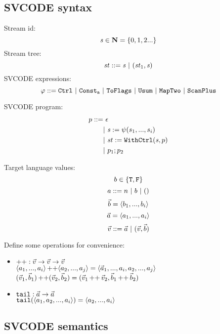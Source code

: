 \subsection{SVCODE syntax}
Stream id: $$\mathit{s} \in \mathbf{N} = \{0,1,2...\}$$
Stream tree: $$ \mathit{st} ::= \mathit{s} \ | \ (\mathit{st}_1,\mathit{s}) $$
SVCODE expressions: $$\varphi ::= \mathtt{Ctrl} \ | \ \mathtt{Const_{a}} \ | \ \mathtt{ToFlags}
\ | \ \mathtt{Usum} \ | \ \mathtt{MapTwo} \ | \ \mathtt{ScanPlus} $$

SVCODE program: 
\begin{align*}
	p ::= & \ \epsilon \\
	     &| \ \mathit{s} := \psi(s_1,...,s_i) \\
	     &| \ \mathit{st} := \mathtt{WithCtrl}(\mathit{s},p) \\
	     &| \ p_1;p_2 	 
\end{align*}

Target language values: 
$$b \in \{\mathtt{T},\mathtt{F} \}$$
$$a ::= n \ | \ b \ | \ \unit$$
$$\vec b = \langle b_1,...,b_i \rangle$$ 
$$\vec a = \langle a_1,...,a_i \rangle  $$
$$\v ::= \a \ | \ (\v,\b) $$

Define some operations for convenience:
\begin{itemize}
	\item $\operatorname{++}: \vec v \rightarrow  \vec v \rightarrow \vec v$ \\
	  $\langle a_1,...,a_i \rangle \operatorname{++} \langle a_2,...,a_j \rangle = \langle \vec a_1,...,a_i,a_2,...,a_j \rangle $ \\
	  $(\vec v_1,\vec b_1) \operatorname{++} (\vec v_2,\vec b_2) = (\vec v_1 \operatorname{++} \vec v_2, \vec b_1 \operatorname{++} \vec b_2)$
	\item $\texttt{tail}: \vec a \rightarrow \vec a$ \\
	      $\mathtt{tail}(\langle a_1, a_2,...,a_i \rangle) = \langle a_2,...,a_i \rangle$
\end{itemize}


\subsection{SVCODE semantics}


